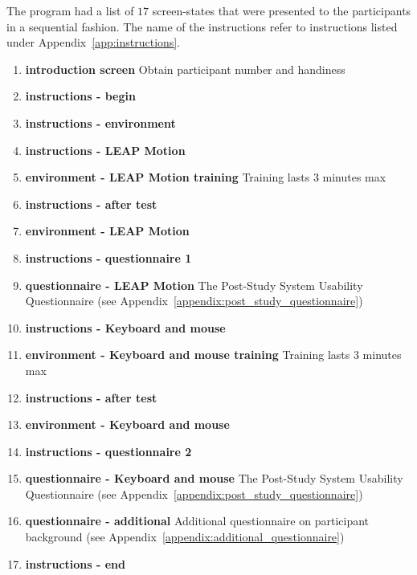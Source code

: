 \noindent The program had a list of $17$ screen-states that were presented to the participants in a sequential fashion. The name of the instructions refer to instructions listed under Appendix~\ref{app:instructions}.
\begin{enumerate}
\item{\textbf{introduction screen}} Obtain participant number and handiness 
\item{\textbf{instructions - begin}}
\item{\textbf{instructions - environment}}
\item{\textbf{instructions - LEAP Motion}}
\item{\textbf{environment - LEAP Motion training}} Training lasts $3$ minutes max
\item{\textbf{instructions - after test}}
\item{\textbf{environment - LEAP Motion}}
\item{\textbf{instructions - questionnaire 1}}
\item{\textbf{questionnaire - LEAP Motion}} The Post-Study System Usability Questionnaire (see Appendix~\ref{appendix:post_study_questionnaire})
\item{\textbf{instructions - Keyboard and mouse}}
\item{\textbf{environment - Keyboard and mouse training}} Training lasts $3$ minutes max
\item{\textbf{instructions - after test}}
\item{\textbf{environment - Keyboard and mouse}} 
\item{\textbf{instructions - questionnaire 2}}
\item{\textbf{questionnaire - Keyboard and mouse}} The Post-Study System Usability Questionnaire (see Appendix~\ref{appendix:post_study_questionnaire})
\item{\textbf{questionnaire - additional}} Additional questionnaire on participant background (see Appendix~\ref{appendix:additional_questionnaire})
\item{\textbf{instructions - end}}
\end{enumerate}

\noindent 

